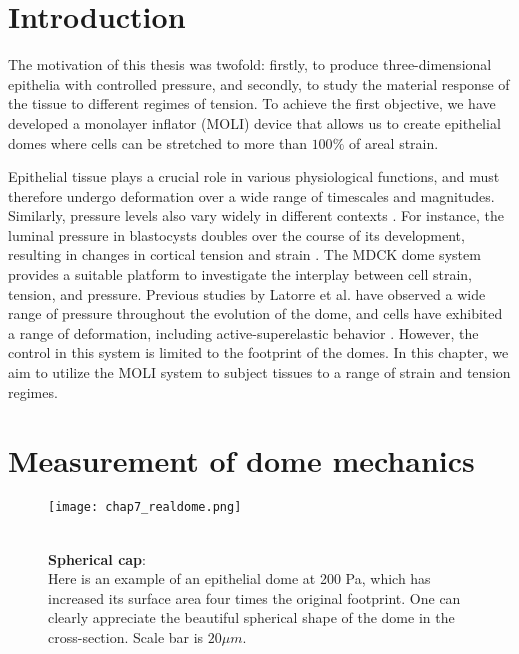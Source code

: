 \hypertarget{introduction}{%
\section{Introduction}\label{introduction2}}

The motivation of this thesis was twofold: firstly, to produce three-dimensional epithelia with controlled pressure, and secondly, to study the material response of the tissue to different regimes of tension. To achieve the first objective, we have developed a monolayer inflator (MOLI) device that allows us to create epithelial domes where cells can be stretched to more than $100\%$ of areal strain.

Epithelial tissue plays a crucial role in various physiological functions, and must therefore undergo deformation over a wide range of timescales and magnitudes. Similarly, pressure levels also vary widely in different contexts \cite{torres-sanchez2021, choudhury2022a}. For instance, the luminal pressure in blastocysts doubles over the course of its development, resulting in changes in cortical tension and strain \cite{chan2019}. The MDCK dome system provides a suitable platform to investigate the interplay between cell strain, tension, and pressure. Previous studies by Latorre et al. have observed a wide range of pressure throughout the evolution of the dome, and cells have exhibited a range of deformation, including active-superelastic behavior \cite{latorre2018}. However, the control in this system is limited to the footprint of the domes. In this chapter, we aim to utilize the MOLI system to subject tissues to a range of strain and tension regimes.

\hypertarget{measurement-of-dome-mechanics}{%
	\section{Measurement of dome
		mechanics}\label{measurement-of-dome-mechanics}}

\begin{figure}
	\begin{minipage}[c]{0.7\textwidth}
		\texttt{[image: chap7\_realdome.png]}
	\end{minipage}\hfill
	\begin{minipage}[c]{0.27\textwidth}
		\caption{\\ \textbf{Spherical cap}:\\Here is an example of an epithelial dome at 200 Pa, which has increased its surface area four times the original footprint. One can clearly appreciate the beautiful spherical shape of the dome in the cross-section. Scale bar is $20 \mu m$.
		} \label{fig_7_1}
	\end{minipage}
\end{figure}

